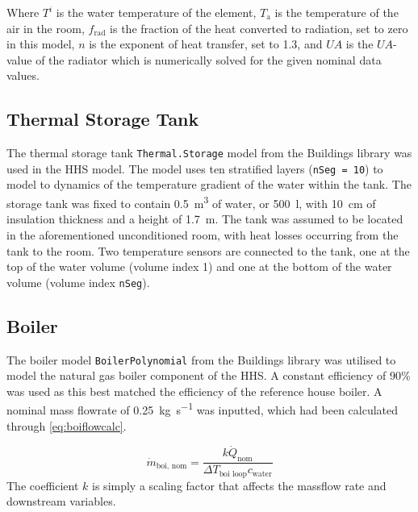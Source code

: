 Where $T^i$ is the water temperature of the element, $T_\text{a}$ is the temperature of the air in the room, $f_\text{rad}$ is the fraction of the heat converted to radiation, set to zero in this model, $n$ is the exponent of heat transfer, set to 1.3, and $UA$ is the $UA$-value of the radiator which is numerically solved for the given nominal data values. 

\subsection{Thermal Storage Tank} \label{subsec:tank}
The thermal storage tank \texttt{Thermal.Storage} model from the Buildings library \cite{wetter_modelica_2014} was used in the \ac{HHS} model. The model uses ten stratified layers (\texttt{nSeg = 10}) to model to dynamics of the temperature gradient of the water within the tank. The storage tank was fixed to contain \qty{0.5}{\cubic\meter} of water, or \qty{500}{\litre}, with \qty{10}{\centi\meter} of insulation thickness and a height of \qty{1.7}{\meter}. The tank was assumed to be located in the aforementioned unconditioned room, with heat losses occurring from the tank to the room. Two temperature sensors are connected to the tank, one at the top of the water volume (volume index 1) and one at the bottom of the water volume (volume index \texttt{nSeg}). 

\subsection{Boiler} \label{subsec:boi}
The boiler model \texttt{BoilerPolynomial} from the Buildings library was utilised to model the natural gas boiler component of the \ac{HHS}. A constant efficiency of 90\% was used as this best matched the efficiency of the reference house boiler. A nominal mass flowrate of \qty{0.25}{\kilo\gram\per\second} was inputted, which had been calculated through \cref{eq:boiflowcalc}.

\begin{equation}
    \dot{m}_\text{boi, nom} = \frac{k\dot{Q}_\text{nom}}{\Delta T_\text{boi loop}  c_\text{water}} \label{eq:boiflowcalc}
\end{equation}
The coefficient $k$ is simply a scaling factor that affects the massflow rate and downstream variables.

